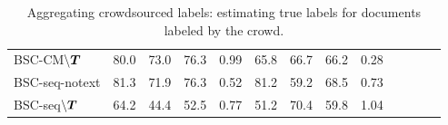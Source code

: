 \begin{table}
\begin{tabular}{l l l l r@{\hskip 0.8cm} l l l r@{\hskip 0.8cm} l l l r }
\\
BSC-CM$\backslash\boldsymbol T$ & 
80.0 & 73.0 & 76.3 & 0.99 &
65.8 & 66.7 & 66.2 & 0.28 &

 \\
BSC-seq-notext & 
81.3 & 71.9 & 76.3 & 0.52 & 
81.2 & 59.2 & 68.5 & 0.73 &

\\ 
BSC-seq$\backslash\boldsymbol T$ & 
64.2 & 44.4 & 52.5 & 0.77 &
51.2 & 70.4 & 59.8 & 1.04 &

\\
\bottomrule 
\end{tabular}
\caption{Aggregating crowdsourced labels: estimating true labels for documents labeled by the crowd.}
\label{tab:aggregation_results}
\npnoround
\end{table}

%
